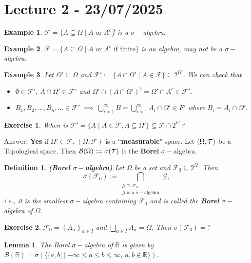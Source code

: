 \documentclass{article}
\newcommand{\1}{\mathds{1}}
\newcommand{\R}{\mathbb{R}}
\newcommand{\F}{\mathcal{F}}
\newcommand{\B}{\mathcal{B}}
\newcommand{\G}{\mathcal{G}}
\newcommand{\lf}{\left}
\newcommand{\rg}{\right}
\newcommand{\Tau}{\text{\Large{$\tau$}}}
\newcommand{\en}[3]{\lf\{{#1}_{#2}\rg\}_{#2\in #3}}
\newtheorem{lemma}[theorem]{Lemma}
\newtheorem{definition}[theorem]{Definition}
\newtheorem{example}{Example}
\newtheorem{exercise}{Exercise}
\begin{document}
\section{Lecture 2 - 23/07/2025}
\begin{example}
    $\F=\{A\subseteq \Omega\mid A\text{ or }A^c$\} is a $\sigma-$algebra.
\end{example}
\begin{example}
    $\F=\{A\subseteq \Omega\mid A\text{ or }A^c\text{ if finite}\}$ is an algebra, may not be a $\sigma-$algebra.
\end{example}
\begin{example}
    Let $\Omega'\subseteq \Omega$ and $\F':=\{A\cap \Omega'\mid A\in\F\}\subseteq 2^{\Omega'}.$ We can check that 
    \begin{itemize}
        \item $\emptyset \in \F',\ A\cap \Omega'\in\F'$ and $\Omega'\cap (A\cap \Omega')^c=\Omega'\cap A^c\in\F'.$
        \item $B_1,B_2,\ldots,B_n,\ldots\in\F'\ \implies\ \bigcup_{i=1}^\infty B=\bigcup_{i=1}^\infty A_i\cap \Omega'\in F'$ where $B_i=A_i\cap \Omega'.$
    \end{itemize}
\end{example}
\begin{exercise}
When is $\F'=\{A\mid A\in\F,A\subseteq \Omega'\}\subseteq \F\cap 2^{\Omega'}$?
\end{exercise}
\noindent Answer: \textbf{Yes} if $\Omega'\in\F.$ $(\Omega,\F)$ is a ``\textbf{measurable}" space. Let $(\Omega,\Tau)$ be a Topological space. Then $\B(\Omega):=\sigma(\Tau)$ is the \textbf{Borel} $\sigma-$algebra.
\begin{definition}\textbf{(Borel $\sigma-$algebra)}
    Let $\Omega$ be a set and $\F_0\subseteq 2^\Omega.$ Then $$\sigma(\F_0):=\bigcap_{\substack{\G\supseteq \F_0\\\G\text{ is a }\sigma-\text{algebra}}}\G,$$ i.e., it is the smallest $\sigma-$algebra containing $\F_0$ and is called the \textbf{Borel} $\sigma-$algebra of $\Omega.$
\end{definition}
\begin{exercise}
    $\F_0=\en A\alpha{I}$ and $\bigsqcup_{\alpha\in I}A_\alpha =\Omega.$ Then $\sigma(\F_0)=?$
\end{exercise}
\begin{lemma}
The Borel $\sigma-$algebra of $\R$ is given by $\B(\R)=\sigma\lf(\{(a,b]\mid -\infty\leq a\leq b\leq \infty,\ a,b\in\R\}\rg).$
\end{lemma}
\end{document}

